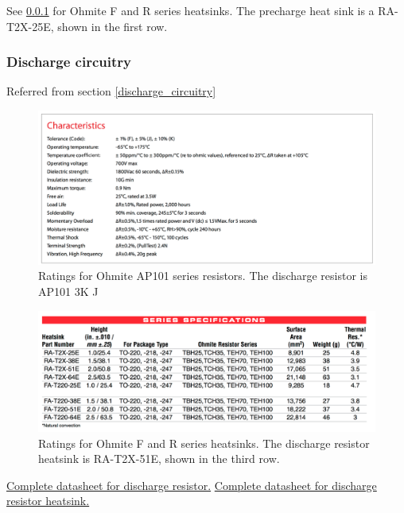 \documentclass{article}
\begin{document}
See \ref{appendix_discharge} for Ohmite F and R series heatsinks. The precharge heat sink is a RA-T2X-25E, shown in the first row. 

\subsubsection{Discharge circuitry}\label{appendix_discharge}
Referred from section \ref{discharge_circuitry}

\begin{figure}[H]
    \centering
    \includegraphics[width=\linewidth]{discharge_res_table}
    \caption{Ratings for Ohmite AP101 series resistors. The discharge resistor is AP101 3K J}
\end{figure}
\begin{figure}[H]
    \centering
    \includegraphics[width=\linewidth]{discharge_heatsink_table}
    \caption{Ratings for Ohmite F and R series heatsinks. The discharge resistor heatsink is RA-T2X-51E, shown in the third row.}
\end{figure}

\href{http://www.ohmite.com/cat/acl_ap101.pdf}{Complete datasheet for discharge resistor.}
\href{http://www.ohmite.com/cat/sink_f_r.pdf}{Complete datasheet for discharge resistor heatsink.}\\
\end{document}
